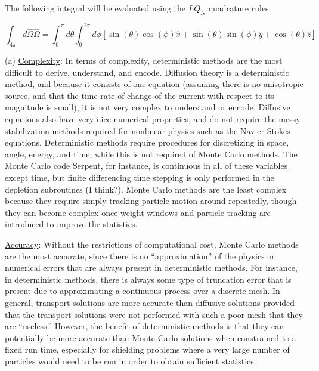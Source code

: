 \documentclass[10pt]{article}
\newcommand*\circled[1]{\tikz[baseline=(char.base)]{
            \node[shape=circle,draw,inner sep=2pt] (char) {#1};}}
\begin{document}
\circled{2} The following integral will be evaluated using the \(LQ_N\) quadrature rules:

\begin{equation}
\int_{4\pi}^{}d\hat{\Omega}\hat{\Omega}=\int_{0}^{\pi}d\theta\int_{0}^{2\pi}d\phi\left\lbrack\sin{(\theta)}\cos{(\phi)}\hat{x}+\sin{(\theta)}\sin{(\phi)}\hat{y}+\cos{(\theta)}\hat{z}\right\rbrack
\end{equation}

\circled{3} (a) \underline{Complexity}: In terms of complexity, deterministic methods are the most difficult to derive, understand, and encode. Diffusion theory is a deterministic method, and because it consists of one equation (assuming there is no anisotropic source, and that the time rate of change of the current with respect to its magnitude is small), it is not very complex to understand or encode. Diffusive equations also have very nice numerical properties, and do not require the messy stabilization methods required for nonlinear physics such as the Navier-Stokes equations. Deterministic methods require procedures for discretizing in space, angle, energy, and time, while this is not required of Monte Carlo methods. The Monte Carlo code Serpent, for instance, is continuous in all of these variables except time, but finite differencing time stepping is only performed in the depletion subroutines (I think?). Monte Carlo methods are the least complex because they require simply tracking particle motion around repeatedly, though they can become complex once weight windows and particle tracking are introduced to improve the statistics.\newline

\underline{Accuracy}: Without the restrictions of computational cost, Monte Carlo methods are the most accurate, since there is no ``approximation'' of the physics or numerical errors that are always present in deterministic methods. For instance, in deterministic methods, there is always some type of truncation error that is present due to approximating a continuous process over a discrete mesh. In general, transport solutions are more accurate than diffusive solutions provided that the transport solutions were not performed with such a poor mesh that they are ``useless.'' However, the benefit of deterministic methods is that they can potentially be more accurate than Monte Carlo solutions when constrained to a fixed run time, especially for shielding problems where a very large number of particles would need to be run in order to obtain sufficient statistics.\newline
\end{document}
